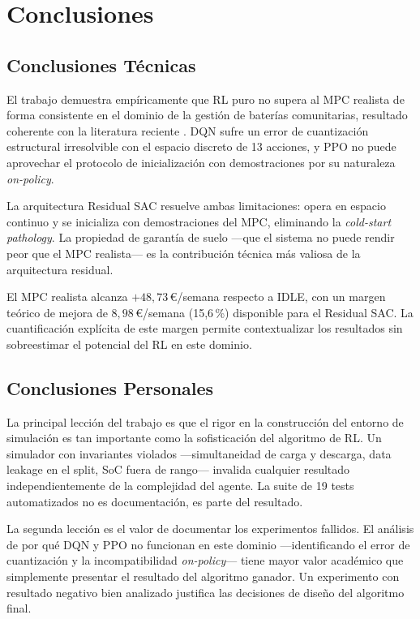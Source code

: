 \documentclass[12pt, a4paper, twoside]{report}
\begin{document}
\chapter{Conclusiones}
\label{chap:conclusiones}

\section{Conclusiones Técnicas}

El trabajo demuestra empíricamente que RL puro no supera al MPC realista de
forma consistente en el dominio de la gestión de baterías comunitarias, resultado
coherente con la literatura reciente \citep{Zhan2023}. DQN sufre un error de
cuantización estructural irresolvible con el espacio discreto de 13 acciones,
y PPO no puede aprovechar el protocolo de inicialización con demostraciones por
su naturaleza \textit{on-policy}.

La arquitectura Residual SAC resuelve ambas limitaciones: opera en espacio
continuo y se inicializa con demostraciones del MPC, eliminando la
\textit{cold-start pathology}. La propiedad de garantía de suelo —que el
sistema no puede rendir peor que el MPC realista— es la contribución técnica
más valiosa de la arquitectura residual.

El MPC realista alcanza $+48{,}73$\,€/semana respecto a IDLE,
con un margen teórico de mejora de $8{,}98$\,€/semana (15{,}6\,\%) disponible
para el Residual SAC. La cuantificación explícita de este margen permite
contextualizar los resultados sin sobreestimar el potencial del RL en este
dominio.

\section{Conclusiones Personales}

La principal lección del trabajo es que el rigor en la construcción del entorno
de simulación es tan importante como la sofisticación del algoritmo de RL. Un
simulador con invariantes violados —simultaneidad de carga y descarga, data
leakage en el split, SoC fuera de rango— invalida cualquier resultado
independientemente de la complejidad del agente. La suite de 19 tests
automatizados no es documentación, es parte del resultado.

La segunda lección es el valor de documentar los experimentos fallidos. El
análisis de por qué DQN y PPO no funcionan en este dominio —identificando el
error de cuantización y la incompatibilidad \textit{on-policy}— tiene mayor
valor académico que simplemente presentar el resultado del algoritmo ganador.
Un experimento con resultado negativo bien analizado justifica las decisiones
de diseño del algoritmo final.
\end{document}
